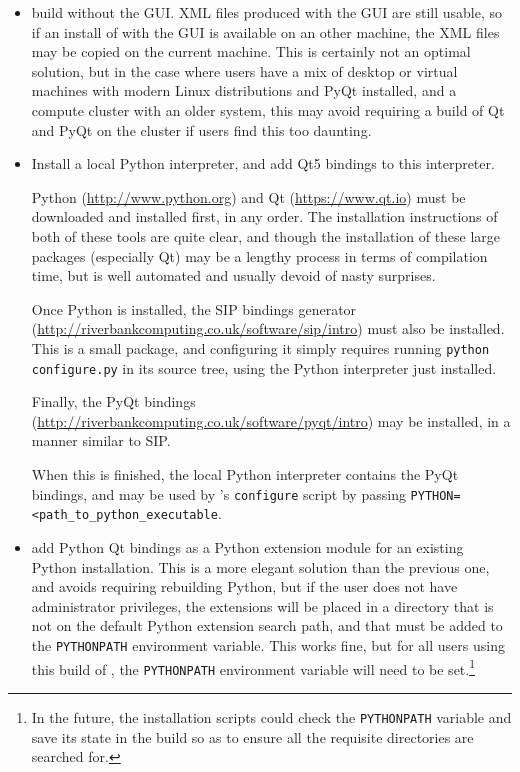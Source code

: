 \documentclass[a4paper,10pt,twoside]{csshortdoc}
\begin{document}
\begin{itemize}

\item build \CS without the GUI. XML files
      produced with the GUI are still usable, so if an install of \CS
      with the GUI is available on an other machine, the XML files
      may be copied on the current machine. This is certainly not an optimal
      solution, but in the case where users have a mix of desktop or virtual
      machines with modern Linux distributions and PyQt installed, and
      a compute cluster with an older system, this may avoid requiring
      a build of Qt and PyQt on the cluster if users find this too daunting.

\item Install a local Python interpreter, and add Qt5 bindings to this
      interpreter.

      Python (\url{http://www.python.org}) and Qt
      (\url{https://www.qt.io}) must be downloaded  and
      installed first, in any order. The installation instructions of
      both of these tools are quite clear, and though the installation of these
      large packages (especially Qt) may be a lengthy process in terms of
      compilation time, but is well automated and usually devoid of nasty
      surprises.

      Once Python is installed, the SIP bindings generator
      (\url{http://riverbankcomputing.co.uk/software/sip/intro})
      must also be installed. This is a small package, and configuring it
      simply requires running \texttt{python configure.py} in its source
      tree, using the Python interpreter just installed.

      Finally, the PyQt bindings
      (\url{http://riverbankcomputing.co.uk/software/pyqt/intro}) may be
      installed, in a manner similar to SIP.

      When this is finished, the local Python interpreter contains
      the PyQt bindings, and may be used by \CS's \texttt{configure}
      script by passing \texttt{PYTHON=<path\_to\_python\_executable}.

\item add Python Qt bindings as a Python extension module for an existing
      Python installation. This is a more elegant solution than the previous
      one, and avoids requiring rebuilding Python, but if the user does not
      have administrator privileges, the extensions will be placed in a
      directory that is not on the default Python extension search path, and
      that must be added to the \texttt{PYTHONPATH} environment variable.
      This works fine, but for all users using this build of \CS, the
      \texttt{PYTHONPATH} environment variable will need to be
      set.\footnote{In the future, the \CS installation scripts could check
      the \texttt{PYTHONPATH} variable and save its state in the build so as
      to ensure all the requisite directories are searched for.}


\end{itemize}
\end{document}
